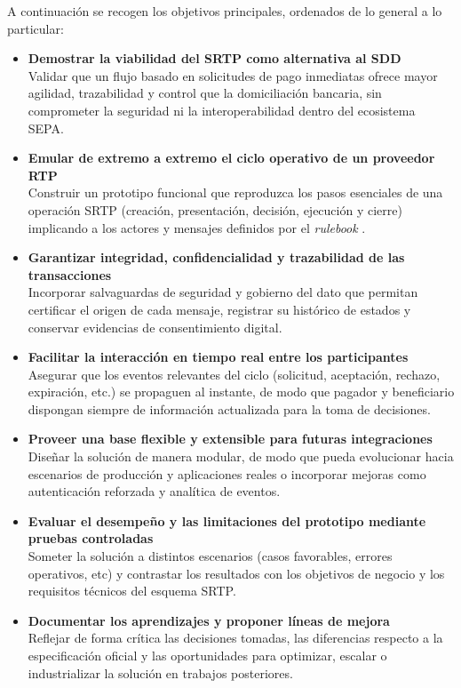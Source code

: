 A continuación se recogen los objetivos principales, ordenados de lo general a lo particular:

\begin{itemize}
    \item \textbf{Demostrar la viabilidad del SRTP como alternativa al SDD} \\
    Validar que un flujo basado en solicitudes de pago inmediatas ofrece mayor agilidad, trazabilidad y control que la domiciliación bancaria, sin comprometer la seguridad ni la interoperabilidad dentro del ecosistema SEPA.
    
    \item \textbf{Emular de extremo a extremo el ciclo operativo de un proveedor RTP}\\
    Construir un prototipo funcional que reproduzca los pasos esenciales de una operación SRTP (creación, presentación, decisión, ejecución y cierre) implicando a los actores y mensajes definidos por el \textit{rulebook} \cite{epc014}.
    
    \item \textbf{Garantizar integridad, confidencialidad y trazabilidad de las transacciones}\\
    Incorporar salvaguardas de seguridad y gobierno del dato que permitan certificar el origen de cada mensaje, registrar su histórico de estados y conservar evidencias de consentimiento digital.
    
    \item \textbf{Facilitar la interacción en tiempo real entre los participantes}\\
    Asegurar que los eventos relevantes del ciclo (solicitud, aceptación, rechazo, expiración, etc.) se propaguen al instante, de modo que pagador y beneficiario dispongan siempre de información actualizada para la toma de decisiones.
    
    \item \textbf{Proveer una base flexible y extensible para futuras integraciones}\\
    Diseñar la solución de manera modular, de modo que pueda evolucionar hacia escenarios de producción y aplicaciones reales o incorporar mejoras como autenticación reforzada y analítica de eventos.
    
    \item \textbf{Evaluar el desempeño y las limitaciones del prototipo mediante pruebas controladas}\\
    Someter la solución a distintos escenarios (casos favorables, errores operativos, etc) y contrastar los resultados con los objetivos de negocio y los requisitos técnicos del esquema SRTP.
    
    \item \textbf{Documentar los aprendizajes y proponer líneas de mejora}\\
    Reflejar de forma crítica las decisiones tomadas, las diferencias respecto a la especificación oficial y las oportunidades para optimizar, escalar o industrializar la solución en trabajos posteriores.
\end{itemize}


